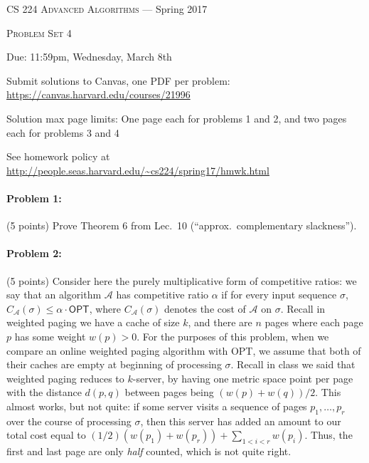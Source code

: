 \documentclass[12pt]{article}
\begin{document}
\thispagestyle{empty}

\begin{center}
{\Large \textsc{CS 224 Advanced Algorithms} --- Spring 2017}

\bigskip

{\Large \textsc{Problem Set 4}}

\smallskip

Due: 11:59pm, Wednesday, March 8th

\medskip

Submit solutions to Canvas, one PDF per problem: \url{https://canvas.harvard.edu/courses/21996}

\medskip

Solution max page limits: One page each for problems 1 and 2, and two pages each for problems 3 and 4

\bigskip

{\footnotesize See homework policy at \url{http://people.seas.harvard.edu/~cs224/spring17/hmwk.html}}
\end{center}
\paragraph{Problem 1:} (5 points) Prove Theorem 6 from Lec.\ 10 (``approx.\ complementary slackness'').

\paragraph{Problem 2:} (5 points) Consider here the purely multiplicative form of competitive ratios: we say that an algorithm $\mathcal{A}$ has competitive ratio $\alpha$ if for every input sequence $\sigma$, $C_{\mathcal{A}}(\sigma) \le \alpha\cdot \textsf{OPT}$, where $C_{\mathcal{A}}(\sigma)$ denotes the cost of $\mathcal{A}$ on $\sigma$. Recall in weighted paging we have a cache of size $k$, and there are $n$ pages where each page $p$ has some weight $w(p) > 0$. For the purposes of this problem, when we compare an online weighted paging algorithm with \textsf{OPT}, we assume that both of their caches are empty at beginning of processing $\sigma$. Recall in class we said that weighted paging reduces to $k$-server, by having one metric space point per page with the distance $d(p,q)$ between pages being $(w(p) + w(q))/2$. This almost works, but not quite: if some server visits a sequence of pages $p_1,\ldots,p_r$ over the course of processing $\sigma$, then this server has added an amount to our total cost equal to $(1/2)(w(p_1) + w(p_r)) + \sum_{1<i<r} w(p_i)$. Thus, the first and last page are only {\em half} counted, which is not quite right.
\end{document}
